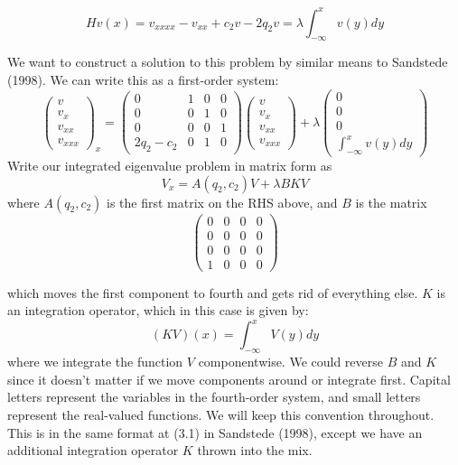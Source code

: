 \documentclass[12pt]{article}
\begin{document}
\begin{equation}\label{inteigproblem}
Hv(x) = v_{xxxx} - v_{xx} + c_2 v - 2 q_2 v = \lambda \int_{-\infty}^x v(y) dy
\end{equation}

We want to construct a solution to this problem by similar means to Sandstede (1998). We can write this as a first-order system:
\[
\begin{pmatrix}v\\v_x\\v_{xx}\\v_{xxx}\end{pmatrix}_x = 
\begin{pmatrix}0 & 1 & 0 & 0 \\ 0 & 0 & 1 & 0 \\ 0 & 0 & 0 & 1 \\ 2q_2 - c_2 & 0 & 1 & 0\end{pmatrix}
\begin{pmatrix}v\\v_x\\v_{xx}\\v_{xxx}\end{pmatrix} + \lambda
\begin{pmatrix}0\\0\\0\\\int_{-\infty}^x v(y) dy\end{pmatrix}
\]
Write our integrated eigenvalue problem in matrix form as
\[
V_x = A(q_2, c_2)V + \lambda B K V
\]
where $A(q_2, c_2)$ is the first matrix on the RHS above, and $B$ is the matrix
\[
\begin{pmatrix}0 & 0 & 0 & 0 \\0 & 0 & 0 & 0 \\0 & 0 & 0 & 0 \\1 & 0 & 0 & 0 \end{pmatrix}
\]

which moves the first component to fourth and gets rid of everything else. $K$ is an integration operator, which in this case is given by:
\[
(KV)(x) = \int_{-\infty}^x V(y) dy
\]
where we integrate the function $V$ componentwise. We could reverse $B$ and $K$ since it doesn't matter if we move components around or integrate first. Capital letters represent the variables in the fourth-order system, and small letters represent the real-valued functions. We will keep this convention throughout. This is in the same format at (3.1) in Sandstede (1998), except we have an additional integration operator $K$ thrown into the mix.\\
\end{document}

